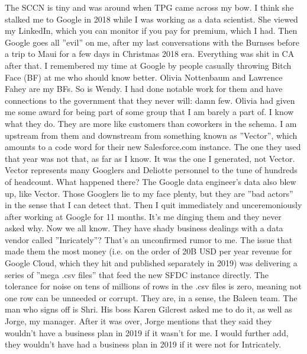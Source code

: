 \documentclass{article}
\begin{document}
\begin{multicols}{2}
The SCCN is tiny and was around when TPG came across my bow. I think she stalked me to Google in 2018 while I was working as a data scientist. She viewed my LinkedIn, which you can monitor if you pay for premium, which I had. Then Google goes all ''evil'' on me, after my last conversations with the Burnses before a trip to Maui for a few days in Christmas 2018 era. Everything was shit in CA after that. I remembered my time at Google by people casually throwing Bitch Face (BF) at me who should know better. Olivia Nottenbaum and Lawrence Fahey are my BFs. So is Wendy. I had done notable work for them and have connections to the government that they never will: damn few. Olivia had given me some award for being part of some group that I am barely a part of. I know what they do. They are more like customers than coworkers in the schema. I am upstream from them and downstream from something known as ''Vector'', which amounts to a code word for their new Salesforce.com instance. The one they used that year was not that, as far as I know. It was the one I generated, not Vector. Vector represents many Googlers and Deliotte personnel to the tune of hundreds of headcount. What happened there? The Google data engineer's data also blew up, like Vector. Those Googlers lie to my face plenty, but they are ''bad actors'' in the sense that I can detect that. Then I quit immediately and unceremoniously after working at Google for 11 months. It's me dinging them and they never asked why. Now we all know. They have shady business dealings with a data vendor called ''Inricately''? That's an unconfirmed rumor to me. The issue that made them the most money (i.e. on the order of 20B USD per year revenue for Google Cloud, which they hit and published separately in 2019) was delivering a series of ''mega .csv files'' that feed the new SFDC instance directly. The tolerance for noise on tens of millions of rows in the .csv files is zero, meaning not one row can be unneeded or corrupt. They are, in a sense, the Baleen team. The man who signs off is Shri. His boss Karen Gilcrest asked me to do it, as well as Jorge, my manager. After it was over, Jorge mentions that they said they wouldn't have a business plan in 2019 if it wasn't for me. I would further add, they wouldn't have had a business plan in 2019 if it were not for Intricately. 


\end{multicols}
\end{document}
